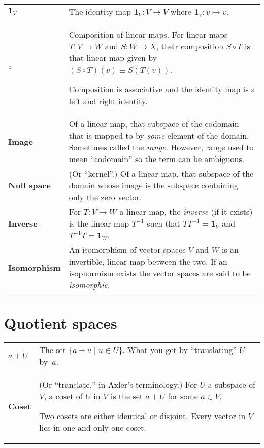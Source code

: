 \documentclass[10pt, a4paper, landscape]{article}
\newcommand{\defn}[1]{\textbf{#1}}
\newcommand{\id}{\mathbold{1}}
\begin{document}
\begin{multicols*}{3}
\begin{tabularx}{\columnwidth}{@{}l>{\raggedright\arraybackslash}X@{}}
  $\id_V$ & The identity map $\id_V\colon V\to V$ where $\id_V\colon v\mapsto v$. \\

  $\circ$ & Composition of linear maps. For linear maps $T\colon V\to W$ and $S\colon W\to X$, their composition $S\circ T$ is that linear map given by $(S\circ T)(v) \equiv S(T(v))$.

  Composition is associative and the identity map is a left and right
  identity. \\

  \defn{Image} & Of a linear map, that subspace of the codomain that is mapped to by \emph{some} element of the domain. Sometimes called the \emph{range}. However, range used to mean “codomain” so the term can be ambiguous. \\

  \defn{Null space} & (Or “kernel”.) Of a linear map, that subspace of the domain whose image is the subspace containing only the zero vector. \\

  \defn{Inverse} & For $T:V\to W$ a linear map, the \emph{inverse} (if it
  exists) is the linear map $T^{-1}$ such that $TT^{-1}=\id_V$ and $T^{-1}T=\id_W$. \\

  \defn{Isomorphism} & An isomorphism of vector spaces $V$ and $W$ is an invertible, linear map between the two. If an isophormism exists the vector spaces are said to be \emph{isomorphic}. 
  
\end{tabularx}


\section*{Quotient spaces}
\begin{tabularx}{\columnwidth}{@{}l>{\raggedright\arraybackslash}X@{}}
  \toprule
  \defn{$a+U$} & The set $\{a+u\mid u\in U\}$. What you get by “translating” $U$ by~$a$.  \\ 

  \defn{Coset} & (Or “translate,” in Axler's terminology.) For $U$ a
  subspace of $V$, a coset of $U$ in $V$ is the set $a+U$ for some $a\in V$.

  Two cosets are either identical or disjoint. Every vector in $V$ lies
  in one and only one coset.  \\


\end{tabularx}
\end{multicols*}
\end{document}
